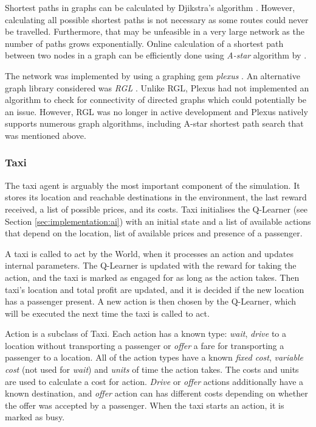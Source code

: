 Shortest paths in graphs can be calculated by Djikstra's algorithm
\parencite{Cormen2009algorithms}. However, calculating all possible shortest
paths is not necessary as some routes could never be travelled. Furthermore,
that may be unfeasible in a very large network as the number of paths grows
exponentially. Online calculation of a shortest path between two nodes in a
graph can be efficiently done using \textit{A-star} algorithm by
\textcite{Hart1968paths}.

The network was implemented by using a graphing gem \textit{plexus}
\parencite{Plexus}. An alternative graph library considered was \textit{RGL}
\parencite{Rgl}. Unlike RGL, Plexus had not implemented an algorithm to check
for connectivity of directed graphs which could potentially be an issue.
However, RGL was no longer in active development and Plexus natively supports
numerous graph algorithms, including A-star shortest path search that was
mentioned above.


\subsubsection{Taxi}

The taxi agent is arguably the most important component of the simulation. It
stores its location and reachable destinations in the environment, the last
reward received, a list of possible prices, and its costs. Taxi initialises the
Q-Learner (see Section \ref{sec:implementation:ai}) with an initial state and a
list of available actions that depend on the location, list of available prices
and presence of a passenger.

A taxi is called to act by the World, when it processes an action and updates
internal parameters. The Q-Learner is updated with the reward for taking the
action, and the taxi is marked as engaged for as long as the action takes. Then
taxi's location and total profit are updated, and it is decided if the new
location has a passenger present. A new action is then chosen by the Q-Learner,
which will be executed the next time the taxi is called to act.

Action is a subclass of Taxi. Each action has a known type: \textit{wait},
\textit{drive} to a location without transporting a passenger or \textit{offer}
a fare for transporting a passenger to a location. All of the action types have
a known \textit{fixed cost}, \textit{variable cost} (not used for
\textit{wait}) and \textit{units} of time the action takes. The costs and units
are used to calculate a cost for action. \textit{Drive} or \textit{offer}
actions additionally have a known destination, and \textit{offer} action can
has different costs depending on whether the offer was accepted by a passenger.
When the taxi starts an action, it is marked as busy.

